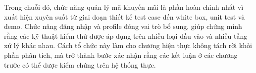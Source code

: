 Trong chuỗi đó, chức năng quản lý mã khuyến mãi là phần hoàn chỉnh nhất vì xuất hiện xuyên suốt từ giai đoạn thiết kế test case đến white box, unit test và demo. Chức năng đăng nhập và profile đóng vai trò bổ sung, giúp chứng minh rằng các kỹ thuật kiểm thử được áp dụng trên nhiều loại đầu vào và nhiều tầng xử lý khác nhau. Cách tổ chức này làm cho chương hiện thực không tách rời khỏi phần phân tích, mà trở thành bước xác nhận rằng các kết luận ở các chương trước có thể được kiểm chứng trên hệ thống thực.
